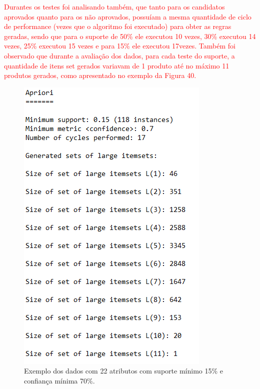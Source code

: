 \par
\textcolor{red}{Durantes os testes foi analisando também, que tanto para os candidatos aprovados quanto para os não aprovados, possuíam a mesma quantidade de ciclo de performance (vezes que o algoritmo foi executado) para obter as regras geradas, sendo que para o suporte de 50\% ele executou 10 vezes, 30\% executou 14 vezes, 25\% executou 15 vezes e para 15\% ele executou 17vezes. Também foi observado que durante a avaliação dos dados, para cada teste do suporte, a quantidade de itens set gerados variavam de 1 produto até no máximo 11 produtos gerados, como apresentado no exemplo da Figura 40.}


\par
\begin{figure}[!htp]
	\begin{center}
    \caption{\label{fig:waveform_fig} Exemplo dos dados com 22 atributos com suporte mínimo 15\% e confiança mínima 70\%.}
	\includegraphics[scale=0.90]{Figuras/Resultados_valores_apriori.png}
	\end{center}
\end{figure}

\par
\textcolor{red}{}

\par
\textcolor{red}{}

\par
\textcolor{red}{}

\par
\textcolor{red}{}

\par
\textcolor{red}{}

\par
\textcolor{red}{}